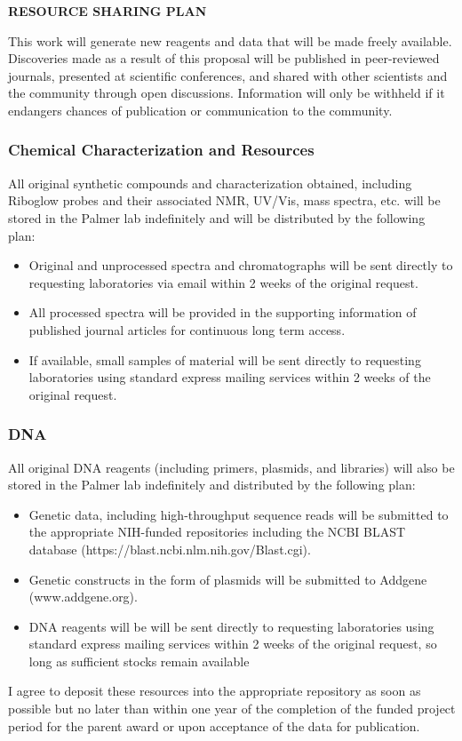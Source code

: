 \documentclass{F32}
\begin{document}
\begin{center}
{\bf RESOURCE SHARING PLAN}
\end{center}

This work will generate new reagents and data that will be made freely available. Discoveries made as a result of this proposal will be published in peer-reviewed journals, presented at scientific conferences, and shared with other scientists and the community through open discussions. Information will only be withheld if it endangers chances of publication or communication to the community.

\subsubsection*{Chemical Characterization and Resources}
All original synthetic compounds and characterization obtained, including Riboglow probes and their associated NMR, UV/Vis, mass spectra, etc. will be stored in the Palmer lab indefinitely and will be distributed by the following plan:
\begin{itemize}
  \item Original and unprocessed spectra and chromatographs will be sent directly to requesting laboratories via email within 2 weeks of the original request.
  \item All processed spectra will be provided in the supporting information of published journal articles for continuous long term access.
  \item If available, small samples of material will be sent directly to requesting laboratories using standard express mailing services within 2 weeks of the original request.
\end{itemize}

\subsubsection*{DNA}
All original DNA reagents (including primers, plasmids, and libraries) will also be stored in the Palmer lab indefinitely and distributed by the following plan:
\begin{itemize}
  \item Genetic data, including high-throughput sequence reads will be submitted to the appropriate NIH-funded repositories including the NCBI BLAST database (https://blast.ncbi.nlm.nih.gov/Blast.cgi).
  \item Genetic constructs in the form of plasmids will be submitted to Addgene (www.addgene.org).
  \item DNA reagents will be will be sent directly to requesting laboratories using standard express mailing services within 2 weeks of the original request, so long as sufficient stocks remain available
\end{itemize}
I agree to deposit these resources into the appropriate repository as soon as possible but no later than within one year of the completion of the funded project period for the parent award or upon acceptance of the data for publication.
\end{document}

